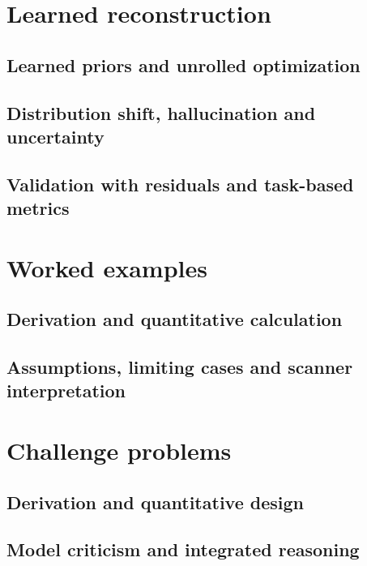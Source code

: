 \section{Learned reconstruction}
\label{sec:16:learned-reconstruction}
\subsection{Learned priors and unrolled optimization}
\subsection{Distribution shift, hallucination and uncertainty}
\subsection{Validation with residuals and task-based metrics}

\section{Worked examples}
\label{sec:16:worked-examples}
\subsection{Derivation and quantitative calculation}
\subsection{Assumptions, limiting cases and scanner interpretation}

\section{Challenge problems}
\label{sec:16:challenge-problems}
\subsection{Derivation and quantitative design}
\subsection{Model criticism and integrated reasoning}
